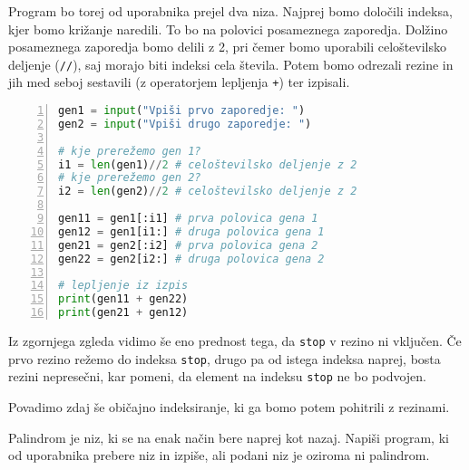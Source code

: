 \begin{resitev}
Program bo torej od uporabnika prejel dva niza. Najprej bomo določili indeksa, kjer bomo križanje naredili. To bo na polovici posameznega zaporedja. Dolžino posameznega zaporedja bomo delili z 2, pri čemer bomo uporabili celoštevilsko deljenje (\texttt{//}), saj morajo biti indeksi cela števila. Potem bomo odrezali rezine in jih med seboj sestavili (z operatorjem lepljenja \texttt{+}) ter izpisali.
\begin{lstlisting}[language=Python,numbers=left]
gen1 = input("Vpiši prvo zaporedje: ")
gen2 = input("Vpiši drugo zaporedje: ")

# kje prerežemo gen 1?
i1 = len(gen1)//2 # celoštevilsko deljenje z 2
# kje prerežemo gen 2?
i2 = len(gen2)//2 # celoštevilsko deljenje z 2

gen11 = gen1[:i1] # prva polovica gena 1
gen12 = gen1[i1:] # druga polovica gena 1
gen21 = gen2[:i2] # prva polovica gena 2
gen22 = gen2[i2:] # druga polovica gena 2

# lepljenje iz izpis
print(gen11 + gen22) 
print(gen21 + gen12)
\end{lstlisting}
\end{resitev}
Iz zgornjega zgleda vidimo še eno prednost tega, da \texttt{stop} v rezino ni vključen. Če prvo rezino režemo do indeksa \texttt{stop}, drugo pa od istega indeksa naprej, bosta rezini nepresečni, kar pomeni, da element na indeksu \texttt{stop} ne bo podvojen.

Povadimo zdaj še običajno indeksiranje, ki ga bomo potem pohitrili z rezinami.

\begin{zgled}
Palindrom je niz, ki se na enak način bere naprej kot nazaj. Napiši program, ki od uporabnika prebere niz in izpiše, ali podani niz je oziroma ni palindrom.
\end{zgled}

